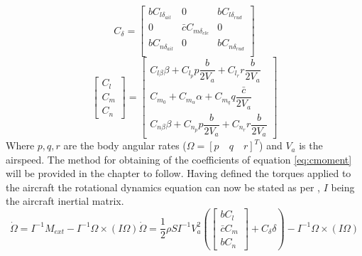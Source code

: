 \begin{equation}
C_\delta = 
\begin{bmatrix}
bC_{l\delta_{ail}} & 0 & bC_{l\delta_{rud}} \\
0 & \bar{c}C_{m\delta_{ele}} & 0 \\
bC_{n\delta_{ail}} & 0 & bC_{n\delta_{rud}}\\
\end{bmatrix}
\label{eq:cdelta}
\end{equation}
\begin{equation}
\begin{bmatrix}
C_l\\
C_m\\
C_n
\end{bmatrix} 
=
\begin{bmatrix}
C_{l\beta} \beta + C_{l_p} p \dfrac{b}{2V_a} + C_{l_r} r \dfrac{b}{2V_a}\\
C_{m_0} + C_{m_\alpha} \alpha + C_{m_q} q \dfrac{\bar{c}}{2V_a}\\
C_{n\beta} \beta + C_{n_p} p \dfrac{b}{2V_a} + C_{n_r} r \dfrac{b}{2V_a}
\end{bmatrix}
\label{eq:cmoment}
\end{equation}
Where $p, q, r$ are the body angular rates ($\Omega = [p\quad q\quad  r]^T$) and $V_a$ is the airspeed. The method for obtaining of the coefficients of equation \ref{eq:cmoment} will be provided in the chapter to follow. Having defined the torques applied to the aircraft the rotational dynamics equation can now be stated as per \cite{hector}, $I$ being the aircraft inertial matrix.
\begin{subequations}
	\begin{equation}
		\dot{\Omega} = I^{-1} M_{ext} - I^{-1}\Omega \times (I\Omega)
	\end{equation}
	\begin{equation}
		\dot{\Omega} = 
		\dfrac{1}{2}\rho S I^{-1} V_a^2\left(
		\begin{bmatrix}
			bC_l\\
			\bar{c}C_m\\
			bC_n
		\end{bmatrix}
		+ C_\delta \delta\right)
		- I^{-1}\Omega \times (I\Omega)	
	\end{equation}

\label{eq:fast_dynamics}
\end{subequations}

